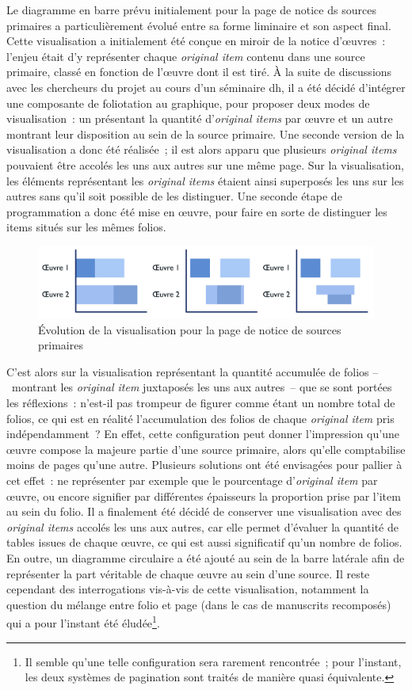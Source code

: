 \documentclass[a4paper,12pt,twoside]{book}
\newcommand{\eng}{\emph}
\newcommand{\oi}{\eng{original item}\xspace}
\newcommand{\ois}{\eng{original items}\xspace}
\newcommand{\dhu}{\gls{dh}\xspace}
\begin{document}
Le diagramme en barre prévu initialement pour la page de notice ds sources primaires a particulièrement évolué entre sa forme liminaire et son aspect final. Cette visualisation a initialement été conçue en miroir de la notice d'œuvres~: l'enjeu était d'y représenter chaque \oi contenu dans une source primaire, classé en fonction de l'œuvre dont il est tiré. À la suite de discussions avec les chercheurs du projet au cours d'un séminaire \dhu, il a été décidé d'intégrer une composante de foliotation au graphique, pour proposer deux modes de visualisation~: un présentant la quantité d'\ois par œuvre et un autre montrant leur disposition au sein de la source primaire. Une seconde version de la visualisation a donc été réalisée~; il est alors apparu que plusieurs \ois pouvaient être accolés les uns aux autres sur une même page. Sur la visualisation, les éléments représentant les \ois étaient ainsi superposés les uns sur les autres sans qu'il soit possible de les distinguer. Une seconde étape de programmation a donc été mise en œuvre, pour faire en sorte de distinguer les items situés sur les mêmes folios.

\begin{figure}[h!]
	\centering
	\includegraphics[width=15cm]{Images/Evolution-visualisation.png}
	\caption{Évolution de la visualisation pour la page de notice de sources primaires}
\end{figure}

C'est alors sur la visualisation représentant la quantité accumulée de folios –~montrant les \oi juxtaposés les uns aux autres~– que se sont portées les réflexions~: n'est-il pas trompeur de figurer comme étant un nombre total de folios, ce qui est en réalité l'accumulation des folios de chaque \oi pris indépendamment~? En effet, cette configuration peut donner l'impression qu'une œuvre compose la majeure partie d'une source primaire, alors qu'elle comptabilise moins de pages qu'une autre. Plusieurs solutions ont été envisagées pour pallier à cet effet~: ne représenter par exemple que le pourcentage d'\oi par œuvre, ou encore signifier par différentes épaisseurs la proportion prise par l'item au sein du folio. Il a finalement été décidé de conserver une visualisation avec des \ois accolés les uns aux autres, car elle permet d'évaluer la quantité de tables issues de chaque œuvre, ce qui est aussi significatif qu'un nombre de folios. En outre, un diagramme circulaire a été ajouté au sein de la barre latérale afin de représenter la part véritable de chaque œuvre au sein d'une source. Il reste cependant des interrogations vis-à-vis de cette visualisation, notamment la question du mélange entre folio et page (dans le cas de manuscrits recomposés) qui a pour l'instant été éludée\footnote{Il semble qu'une telle configuration sera rarement rencontrée~; pour l'instant, les deux systèmes de pagination sont traités de manière quasi équivalente.}.
\end{document}
